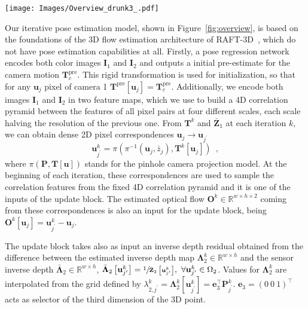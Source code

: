 \documentclass{article}
\begin{document}
\begin{figure*}[ht!]
    \centering
    \texttt{[image: Images/Overview\_drunk3\_.pdf]}
    \caption{\textbf{Overview of the Drunkard's Odometry architecture.} 
    }
    \label{fig:overview}
\end{figure*}

Our iterative pose estimation model, shown in Figure~\ref{fig:overview}, is based on the foundations of the 3D flow estimation architecture of RAFT-3D~\cite{teed2021raft}, which do not have pose estimation capabilities at all. Firstly, a pose regression network encodes both color images $\mathbf{I}_1$ and $\mathbf{I}_2$ and outputs a initial pre-estimate for the camera motion $\mathbf{T}_c^{\text{pre}}$. This rigid transformation is used for initialization, so that for any $\mathbf{u}_j$ pixel of camera 1  $\mathbf{T}^{\text{pre}}\left[\mathbf{u}_j\right] = \mathbf{T}_c^{\text{pre}}$. Additionally, we encode both images $\mathbf{I}_1$ and $\mathbf{I}_2$ in two feature maps, which we use to build a 4D correlation pyramid between the features of all pixel pairs at four different scales, each scale halving the resolution of the previous one. From $\mathbf{T}^k$ and  $\bar{\mathbf{Z}}_1$ at each iteration $k$, we can obtain dense 2D pixel correspondences $\mathbf{u}_j \rightarrow \mathbf{u}_{j^\prime}$
\begin{equation}
   {\mathbf{u}_{j^\prime}^k = \pi \left( \pi^{-1}\left(\mathbf{u}_j, \bar{z}_j \right), \mathbf{T}^k\left[\mathbf{u}_j\right] \right)} \enspace,
\label{eq:1}
\end{equation}
where $\pi \left( \mathbf{P}, \mathbf{T}\left[\mathbf{u}\right] \right)$ stands for the pinhole camera projection model. At the beginning of each iteration, these correspondences are used to sample the correlation features from the fixed 4D correlation pyramid and it is one of the inputs of the update block. The estimated optical flow $\mathbf{O}^k \in \mathbb{R}^{w\times h\times 2}$ coming from these correspondences is also an input for the update block, being $\mathbf{O}^k[\mathbf{u}_j] = \mathbf{u}_{j^\prime}^k-\mathbf{u}_j$. 

The update block takes also as input an inverse depth residual obtained from the difference between the estimated inverse depth map $\mathbf{\Lambda}_2^k \in \mathbb{R}^{w \times h}$ and the sensor inverse depth $\bar{\mathbf{\Lambda}}_2\in \mathbb{R}^{w \times h}$, $\bar{\mathbf{\Lambda}}_2 \left[ \mathbf{u}^k_{j^\prime} \right] = \sfrac{1}{\bar{\mathbf{Z}}_2\left[ \mathbf{u}^k_{j^\prime} \right]}, \ \forall \mathbf{u}_{j^\prime}^k \in \Omega_2$. Values for $\mathbf{\Lambda}_2^k$ are interpolated from the grid defined by $\lambda_{2,j^\prime}^k = \mathbf{\Lambda}_2^k[\mathbf{u}_{j^\prime}^k] = \mathbf{e}_3^\top \mathbf{P}_{j^\prime}^k$.  $\mathbf{e}_3 = \left( 0 \ 0 \ 1 \right)^\top$ acts as selector of the third dimension of the 3D point.
\end{document}
